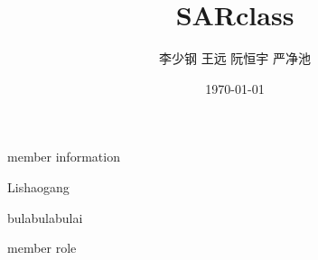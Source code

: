 \documentclass[24pt]{article}%
\title{\heiti SARclass}
\author{\kaishu 李少钢 王远 阮恒宇 严净池}
\date{\today}
\begin{document}
	\maketitle
	
	\title{\heiti}  member information
	
	Lishaogang 
	
	bulabulabulai
	
	
	\title{\heiti}  member role
	
	
	
	
\end{document}
